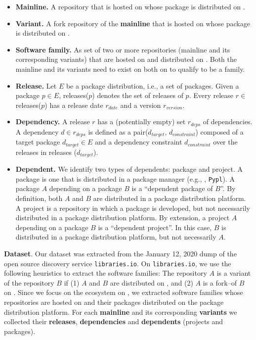 \begin{itemize}
    \item \textbf{Mainline.} A repository that is hosted on \scp whose package is distributed on \npm.

    \item \textbf{Variant.} A fork repository of the \textbf{mainline} that is hosted on \scp whose package is distributed on \npm.

    \item \textbf{Software family.} As set of two or more repositories (mainline and its corresponding variants) that are hosted on \scp and distributed on \npm. Both the mainline and its variants need to exist on both on \np to qualify to be a family.

    \item \textbf{Release.} Let $E$ be a package distribution, i.e., a set of packages. Given a package $p\in E$, releases($p$) denotes the set of releases of $p$. Every release $r\in$ releases($p$) has a release date $r_{date}$ and a version $r_{version}$.

     \item \textbf{Dependency.} A release $r$ has a (potentially empty) set $r_{deps}$ of dependencies. A dependency $d \in r_{deps}$ is defined as a pair($d_{target}$, $d_{constraint}$) composed of a target package $d_{target} \in E$ and a dependency constraint $d_{constraint}$ over the releases in releases ($d_{target}$).

    \item \textbf{Dependent.} We identify two types of dependents: package and project. A package is one that is distributed in a package manager (e.g., \np, \texttt{Pypl}). A package $A$ depending on a package $B$ is a ``dependent package of $B$''. By definition, both $A$ and $B$ are distributed in a package distribution platform. A project is a repository in which a package is developed, but not necessarily distributed in a package distribution platform. By extension, a project $A$ depending on a package $B$ is a ``dependent project''. In this case, $B$ is distributed in a package distribution platform, but not necessarily $A$.

\end{itemize}

\textbf{Dataset}. Our dataset was extracted from the January 12, 2020 dump of the open source discovery service \texttt{libraries.io}\cite{libraries.io}. On \texttt{libraries.io}, we use the following heuristics to extract the software families: The repository $A$ is a variant of the repository $B$ if (1) $A$ and $B$ are distributed on \npm, and (2) $A$ is a fork--of $B$ on \scp. Since we focus on the \js ecosystem on \gh, we extracted software families whose repositories are hosted on \gh and their packages distributed on the \np package distribution platform. For each \textbf{mainline} and its corresponding \textbf{variants} we collected their \textbf{releases}, \textbf{dependencies} and \textbf{dependents} (projects and packages).





